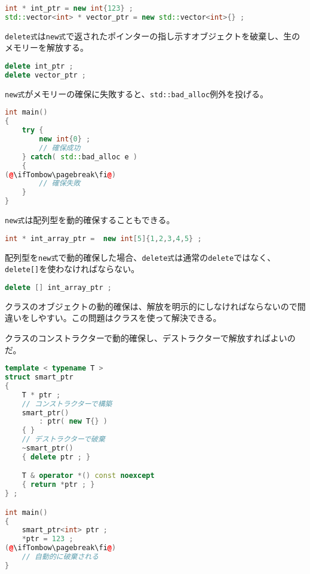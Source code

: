 \begin{lstlisting}[language={C++}]
int * int_ptr = new int{123} ;
std::vector<int> * vector_ptr = new std::vector<int>{} ;
\end{lstlisting}

\texttt{delete式}は\texttt{new式}で返されたポインターの指し示すオブジェクトを破棄し、生のメモリーを解放する。

\begin{lstlisting}[language={C++}]
delete int_ptr ;
delete vector_ptr ;
\end{lstlisting}

\texttt{new式}がメモリーの確保に失敗すると、\texttt{std::bad\_alloc}例外を投げる。

\begin{lstlisting}[language={C++}]
int main()
{
    try {
        new int{0} ;
        // 確保成功
    } catch( std::bad_alloc e )
    {
(@\ifTombow\pagebreak\fi@)
        // 確保失敗
    }
}
\end{lstlisting}


\texttt{new式}は配列型を動的確保することもできる。

\begin{lstlisting}[language={C++}]
int * int_array_ptr =  new int[5]{1,2,3,4,5} ;
\end{lstlisting}

配列型を\texttt{new式}で動的確保した場合、\texttt{delete式}は通常の\texttt{delete}ではなく、\texttt{delete[]}を使わなければならない。

\begin{lstlisting}[language={C++}]
delete [] int_array_ptr ;
\end{lstlisting}


クラスのオブジェクトの動的確保は、解放を明示的にしなければならないので間違いをしやすい。この問題はクラスを使って解決できる。

クラスのコンストラクターで動的確保し、デストラクターで解放すればよいのだ。

\begin{lstlisting}[language={C++}]
template < typename T >
struct smart_ptr
{
    T * ptr ;
    // コンストラクターで構築
    smart_ptr()
        : ptr( new T{} )
    { }
    // デストラクターで破棄
    ~smart_ptr()
    { delete ptr ; }

    T & operator *() const noexcept
    { return *ptr ; }
} ;

int main()
{
    smart_ptr<int> ptr ;
    *ptr = 123 ;
(@\ifTombow\pagebreak\fi@)
    // 自動的に破棄される
}
\end{lstlisting}

